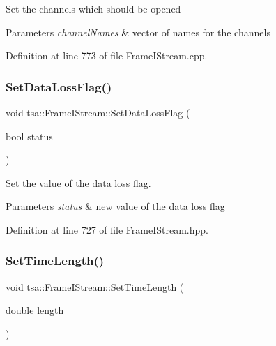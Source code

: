 Set the channels which should be opened


\begin{DoxyParams}{Parameters}
{\em channel\+Names} & vector of names for the channels \\
\hline
\end{DoxyParams}


Definition at line 773 of file Frame\+I\+Stream.\+cpp.

\mbox{\label{classtsa_1_1_frame_i_stream_a188c2351c1717037f955c959e61629ff}} 
\subsubsection{\texorpdfstring{Set\+Data\+Loss\+Flag()}{SetDataLossFlag()}}
{\footnotesize\ttfamily void tsa\+::\+Frame\+I\+Stream\+::\+Set\+Data\+Loss\+Flag (\begin{DoxyParamCaption}\item[{bool}]{status }\end{DoxyParamCaption})\hspace{0.3cm}{\ttfamily [inline]}}

Set the value of the data loss flag.


\begin{DoxyParams}{Parameters}
{\em status} & new value of the data loss flag \\
\hline
\end{DoxyParams}


Definition at line 727 of file Frame\+I\+Stream.\+hpp.

\mbox{\label{classtsa_1_1_frame_i_stream_a8fb9dea502f55380a8a21e2976efa9b2}} 
\subsubsection{\texorpdfstring{Set\+Time\+Length()}{SetTimeLength()}}
{\footnotesize\ttfamily void tsa\+::\+Frame\+I\+Stream\+::\+Set\+Time\+Length (\begin{DoxyParamCaption}\item[{double}]{length }\end{DoxyParamCaption})}

